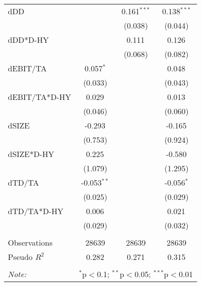 \begin{table}[!htbp]
\begin{tabular}{@{\extracolsep{5pt}}lccc}
 dDD & & 0.161$^{***}$ & 0.138$^{***}$ \\
& & (0.038) & (0.044) \\
 dDD*D-HY & & 0.111$^{}$ & 0.126$^{}$ \\
& & (0.068) & (0.082) \\
 dEBIT/TA & 0.057$^{*}$ & & 0.048$^{}$ \\
& (0.033) & & (0.043) \\
 dEBIT/TA*D-HY & 0.029$^{}$ & & 0.013$^{}$ \\
& (0.046) & & (0.060) \\
 dSIZE & -0.293$^{}$ & & -0.165$^{}$ \\
& (0.753) & & (0.924) \\
 dSIZE*D-HY & 0.225$^{}$ & & -0.580$^{}$ \\
& (1.079) & & (1.295) \\
 dTD/TA & -0.053$^{**}$ & & -0.056$^{*}$ \\
& (0.025) & & (0.029) \\
 dTD/TA*D-HY & 0.006$^{}$ & & 0.021$^{}$ \\
& (0.029) & & (0.032) \\
\hline \\[-1.8ex]
 Observations & 28639 & 28639 & 28639 \\
 Pseudo $R^2$ & 0.282 & 0.271 & 0.315 \\
\hline
\hline \\[-1.8ex]
\textit{Note:} & \multicolumn{3}{r}{$^{*}$p$<$0.1; $^{**}$p$<$0.05; $^{***}$p$<$0.01} \\
\end{tabular}
\end{table}